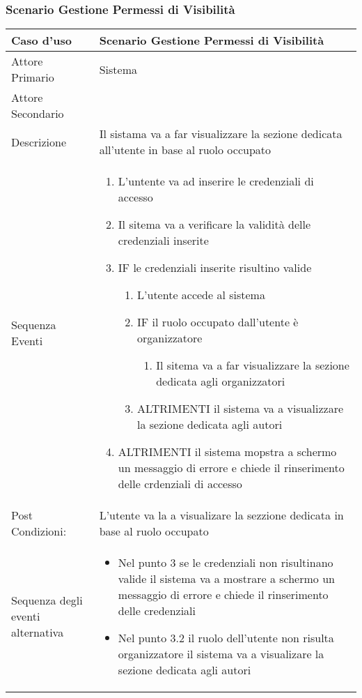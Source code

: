 \subsubsection{Scenario Gestione Permessi di Visibilità}
\begin{tabular}{|p{3cm}|p{7cm}|}
\hline 
\rowcolor{Orchid}
Caso d'uso & Scenario Gestione Permessi di Visibilità \\
\hline
Attore Primario & Sistema\\
\hline
Attore Secondario & \\
\hline
Descrizione & Il sistama va a far visualizzare la sezione dedicata all'utente in base al ruolo occupato\\
\hline
 Sequenza Eventi & 
\begin{enumerate}
  \item L'untente va ad inserire le credenziali di accesso
  \item Il sitema va a verificare la validità delle credenziali inserite 
  \item IF le credenziali inserite risultino valide
  \begin{enumerate}
    \item L'utente accede al sistema
    \item IF il ruolo occupato dall'utente è organizzatore
    \begin{enumerate}
      \item Il sitema va a far visualizzare la sezione dedicata agli organizzatori
    \end{enumerate}
  \item ALTRIMENTI il sistema va a visualizzare la sezione dedicata agli autori
  \end{enumerate}
\item ALTRIMENTI il sistema mopstra a schermo un messaggio di errore e chiede il rinserimento delle crdenziali di accesso
\end{enumerate}\\
\hline
Post Condizioni: & L'utente va la a visualizare la sezzione dedicata in base al ruolo occupato\\
\hline
Sequenza degli eventi alternativa & \begin{itemize}
  \item Nel punto 3 se le credenziali non risultinano valide il sistema va a mostrare a schermo un messaggio di errore e chiede il rinserimento delle credenziali
  \item Nel punto 3.2 il ruolo dell'utente non risulta organizzatore il sistema va a visualizare la sezione dedicata agli autori
\end{itemize} \\
  \hline
\end{tabular}\\

